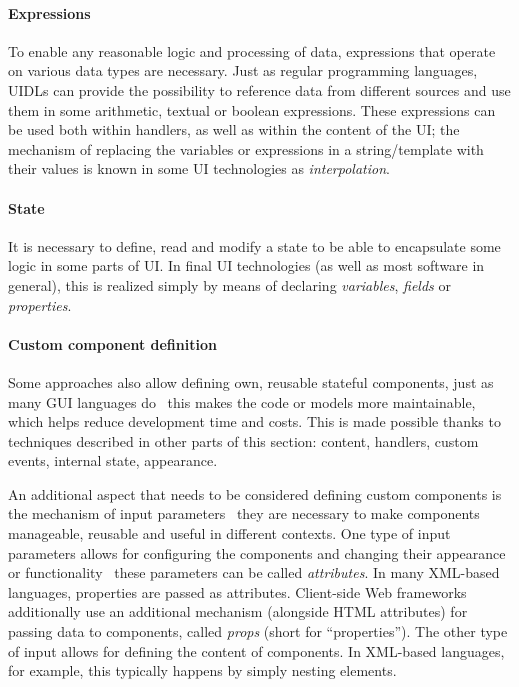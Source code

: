\paragraph{Expressions}
To enable any reasonable logic and processing of data, expressions that operate on various data types are necessary.
Just as regular programming languages, UIDLs can provide the possibility to reference data from different sources and use them in some arithmetic, textual or boolean expressions.
These expressions can be used both within handlers, as well as within the content of the UI;
the mechanism of replacing the variables or expressions in a string/template with their values is known in some UI technologies as \emph{interpolation}.

\paragraph{State}
It is necessary to define, read and modify a state to be able to encapsulate some logic in some parts of UI\@.
In final UI technologies (as well as most software in general), this is realized simply by means of declaring \emph{variables}, \emph{fields} or \emph{properties}.

\paragraph{Custom component definition}
Some approaches also allow defining own, reusable stateful components, just as many GUI languages do \textendash\ this makes the code or models more maintainable, which helps reduce development time and costs.
This is made possible thanks to techniques described in other parts of this section: content, handlers, custom events, internal state, appearance.

An additional aspect that needs to be considered defining custom components is the mechanism of input parameters \textendash\ they are necessary to make components manageable, reusable and useful in different contexts.
One type of input parameters allows for configuring the components and changing their appearance or functionality \textendash\ these parameters can be called \emph{attributes}.
In many XML-based languages, properties are passed as attributes.
Client-side Web frameworks additionally use an additional mechanism (alongside HTML attributes) for passing data to components, called \emph{props} (short for \enquote{properties}).
The other type of input allows for defining the content of components.
In XML-based languages, for example, this typically happens by simply nesting elements.

